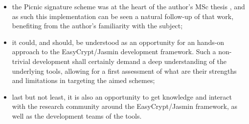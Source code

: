 \documentclass[preprint]{iacrtrans}
\begin{document}
  \begin{itemize}
    \item the Picnic signature scheme was at the heart of the author's MSc
      thesis \cite{MScThesis}, and as such this implementation can be seen a
      natural follow-up of that work, benefiting from the author's
      familiarity with the subject;
    \item it could, and should, be understood as an opportunity for an
      hands-on approach to the EasyCrypt/Jasmin development
      framework. Such a non-trivial development shall certainly demand a
      deep understanding of the underlying tools, allowing for a first
      assessment of what are their strengths and limitations in targeting
      the aimed schemes;
    \item last but not least, it is also an opportunity to get knowledge
      and interact with the research community around the EasyCrypt/Jasmin
      framework, as well as the development teams of the tools.
  \end{itemize}




\printbibliography{}
\end{document}
